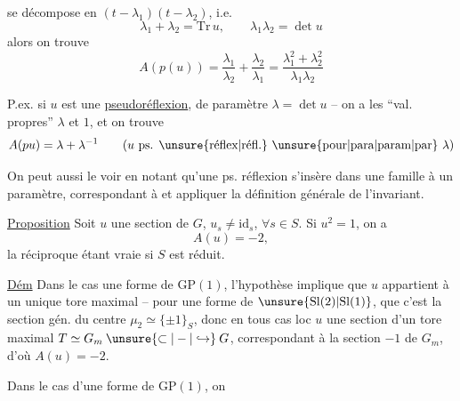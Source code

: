 se décompose en $(t-\lambda_1)(t-\lambda_2)$, i.e.
\[
\lambda_1+\lambda_2=\mathrm{Tr}\,u,\qquad\lambda_1\lambda_2=\det u
\]
alors on trouve
\[
A(p(u))=\frac{\lambda_1}{\lambda_2}+\frac{\lambda_2}{\lambda_1}=\frac{\lambda_1^2+\lambda_2^2}{\lambda_1\lambda_2}
\]

P.ex. si $u$ est une \uline{pseudoréflexion},  de paramètre $\lambda=\det u$ -- on a les ``val. propres'' $\lambda$ et $1$, et on trouve
\[
A(pu)=\lambda+\lambda^{-1}\qquad(u\text{ ps. }\unsure{\text{réflex}|\text{réfl.}}\ \unsure{\text{pour}|\text{para}|\text{param}|\text{par}}\ \lambda)
\]

On peut aussi le voir en notant qu'une ps. réflexion s'insère dans une famille à un paramètre, correspondant à
et appliquer la définition générale de l'invariant.

\uline{Proposition} Soit $u$ une section de $G$,   $u_s\ne\mathrm{id}_s$, $\forall s\in S$.  Si $u^2=1$,  on a
\[
A(u)=-2,
\]
la réciproque étant vraie si $S$ est réduit.

\uline{Dém} Dans le cas   une forme de $\mathrm{GP}(1)$, l'hypothèse  implique que $u$ appartient à un unique tore maximal -- pour une forme de  $\unsure{\mathrm{Sl}(2)|\mathrm{Sl}(1)}$, que c'est la section gén. du centre $\mu_2\simeq\{\pm1\}_S$, donc en tous cas loc $u$   une section d'un tore maximal $T\simeq G_m\mathbin{\unsure{\subset|-|\hookrightarrow}}G$, correspondant à la section $-1$ de $G_m$, d'où $A(u)=-2$.

Dans le cas d'une forme de $\mathrm{GP}(1)$, on 
